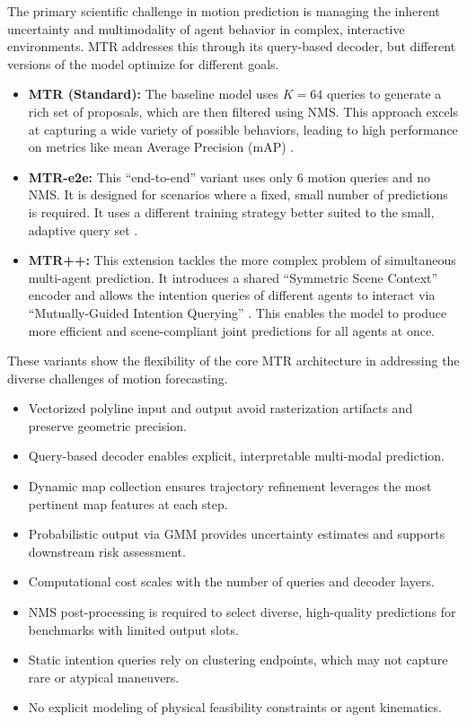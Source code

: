 The primary scientific challenge in motion prediction is managing the inherent uncertainty and multimodality of agent behavior in complex, interactive environments. MTR addresses this through its query-based decoder, but different versions of the model optimize for different goals.

\begin{itemize}
    \item \textbf{MTR (Standard):} The baseline model uses $K=64$ queries to generate a rich set of proposals, which are then filtered using NMS. This approach excels at capturing a wide variety of possible behaviors, leading to high performance on metrics like mean Average Precision (mAP) \cite{Shi2022MTR}.
    \item \textbf{MTR-e2e:} This ``end-to-end'' variant uses only 6 motion queries and no NMS. It is designed for scenarios where a fixed, small number of predictions is required. It uses a different training strategy better suited to the small, adaptive query set \cite{Shi2022MTR}.
    \item \textbf{MTR++:} This extension tackles the more complex problem of simultaneous multi-agent prediction. It introduces a shared ``Symmetric Scene Context'' encoder and allows the intention queries of different agents to interact via ``Mutually-Guided Intention Querying'' \cite{Shi2023MTRplusplus}. This enables the model to produce more efficient and scene-compliant joint predictions for all agents at once.
\end{itemize}

These variants show the flexibility of the core MTR architecture in addressing the diverse challenges of motion forecasting.

\begin{itemize}[leftmargin=*, label=\greenoplus]
  \item Vectorized polyline input and output avoid rasterization artifacts and preserve geometric precision.
  \item Query-based decoder enables explicit, interpretable multi-modal prediction.
  \item Dynamic map collection ensures trajectory refinement leverages the most pertinent map features at each step.
  \item Probabilistic output via GMM provides uncertainty estimates and supports downstream risk assessment.
\end{itemize}

\begin{itemize}[leftmargin=*, label=\redominus]
  \item Computational cost scales with the number of queries and decoder layers.
  \item NMS post-processing is required to select diverse, high-quality predictions for benchmarks with limited output slots.
  \item Static intention queries rely on clustering endpoints, which may not capture rare or atypical maneuvers.
  \item No explicit modeling of physical feasibility constraints or agent kinematics.
\end{itemize}